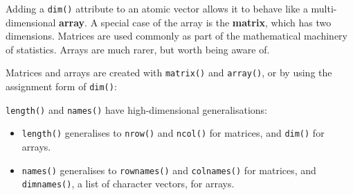 
Adding a \texttt{dim()} attribute to an atomic vector allows it to
behave like a multi-dimensional \textbf{array}. A special case of the
array is the \textbf{matrix}, which has two dimensions. Matrices are
used commonly as part of the mathematical machinery of statistics.
Arrays are much rarer, but worth being aware of.

Matrices and arrays are created with \texttt{matrix()} and
\texttt{array()}, or by using the assignment form of \texttt{dim()}:

\begin{Shaded}
\begin{Highlighting}[]
\StringTok{ }\NormalTok{(}\NormalTok{:}\NormalTok{, } \NormalTok{, } \NormalTok{)}
\StringTok{ }\NormalTok{(}\NormalTok{:}\NormalTok{, }\NormalTok{(}\NormalTok{, }\NormalTok{, }\NormalTok{))}

\StringTok{ }\NormalTok{:}
\StringTok{ }\NormalTok{(}\NormalTok{, }\NormalTok{)}
\CommentTok{#>      [,1] [,2]}
\StringTok{ }\NormalTok{(}\NormalTok{, }\NormalTok{)}
\CommentTok{#>      [,1] [,2] [,3]}
\end{Highlighting}
\end{Shaded}

\texttt{length()} and \texttt{names()} have high-dimensional
generalisations:

\begin{itemize}
\item
  \texttt{length()} generalises to \texttt{nrow()} and \texttt{ncol()}
  for matrices, and \texttt{dim()} for arrays.
\item
  \texttt{names()} generalises to \texttt{rownames()} and
  \texttt{colnames()} for matrices, and \texttt{dimnames()}, a list of
  character vectors, for arrays.
\end{itemize}


